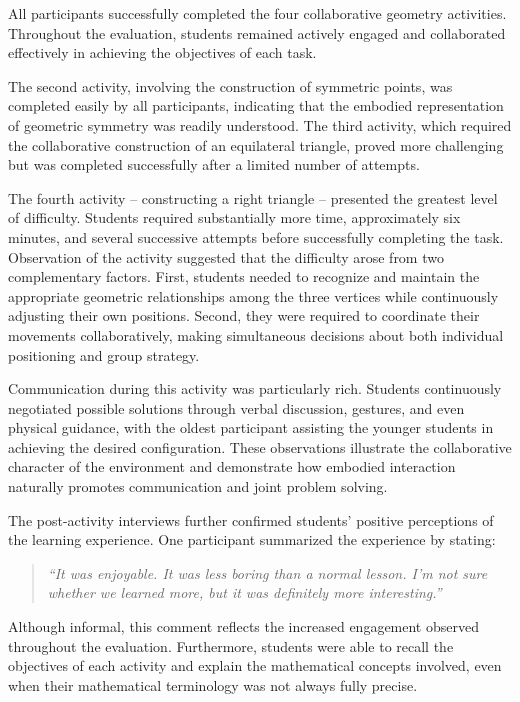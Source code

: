 All participants successfully completed the four collaborative geometry
activities. Throughout the evaluation, students remained actively
engaged and collaborated effectively in achieving the objectives of each
task.

The second activity, involving the construction of symmetric points, was
completed easily by all participants, indicating that the embodied
representation of geometric symmetry was readily understood. The third
activity, which required the collaborative construction of an
equilateral triangle, proved more challenging but was completed
successfully after a limited number of attempts.

The fourth activity -- constructing a right triangle -- presented the
greatest level of difficulty. Students required substantially more time,
approximately six minutes, and several successive attempts before
successfully completing the task. Observation of the activity suggested
that the difficulty arose from two complementary factors. First,
students needed to recognize and maintain the appropriate geometric
relationships among the three vertices while continuously adjusting
their own positions. Second, they were required to coordinate their
movements collaboratively, making simultaneous decisions about both
individual positioning and group strategy.

Communication during this activity was particularly rich. Students
continuously negotiated possible solutions through verbal discussion,
gestures, and even physical guidance, with the oldest participant
assisting the younger students in achieving the desired configuration.
These observations illustrate the collaborative character of the
environment and demonstrate how embodied interaction naturally promotes
communication and joint problem solving.

The post-activity interviews further confirmed students' positive
perceptions of the learning experience. One participant summarized the
experience by stating:

\begin{quote}
\emph{``It was enjoyable. It was less boring than a normal lesson. I'm
not sure whether we learned more, but it was definitely more
interesting.''}
\end{quote}

Although informal, this comment reflects the increased engagement
observed throughout the evaluation. Furthermore, students were able to
recall the objectives of each activity and explain the mathematical
concepts involved, even when their mathematical terminology was not
always fully precise.

